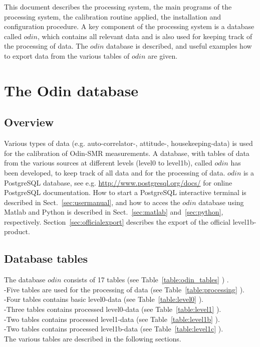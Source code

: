 \documentclass[12pt]{article}
\begin{document}
This document describes the processing system,
the main programs of the processing system,
the calibration routine applied,  
the installation and configuration procedure.
A key component of the processing system is a database 
called \(odin\), which contains all relevant data
and is also used for keeping track of the processing of data.
The \(odin\) database is described, and useful examples
how to export data from the various tables of \(odin\) are given.


\clearpage
\newpage


\section{The Odin database}
\subsection{Overview}
Various types of data 
(e.g. auto-correlator-, attitude-, housekeeping-data) is used for the 
calibration of Odin-SMR measurements.
A database, with tables of data from the various sources at different levels
(level0 to level1b), 
called \(odin\) has been developed, to keep track of all
data and for the processing of data.
\(odin\) is a PostgreSQL database, see e.g. \url{http://www.postgresql.org/docs/} for online PostgreSQL documentation.
How to start a PostgreSQL interactive terminal is described in 
Sect.~\ref{sec:usermanual}, and how to 
acces the \(odin\) database using Matlab
and Python is described in Sect.~\ref{sec:matlab} and~\ref{sec:python},
respectively. 
Section~\ref{sec:officialexport} describes the export of the
official level1b-product.

\subsection{Database tables}
The database \(odin\) consists of 17 tables (see Table~\ref{table:odin_tables} ) .\\ 
-Five tables are used for the processing of data (see Table~\ref{table:processing} ).\\
-Four tables contains basic level0-data (see Table~\ref{table:level0} ).\\
-Three tables contains processed level0-data (see Table~\ref{table:level1} ).\\ 
-Two tables contains processed level1-data (see Table~\ref{table:level1b} ).\\ 
-Two tables contains processed level1b-data (see Table~\ref{table:level1c} ).\\ 
The various tables are described in the following sections.
\end{document}
